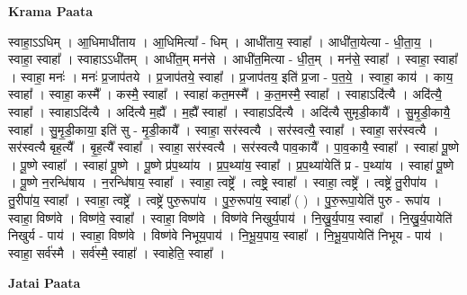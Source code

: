 \documentclass[17pt]{extarticle}
\begin{document}
\textbf{Krama Paata} \newline

स्वाहा॒ऽऽधिम् । आ॒धिमाधी॑ताय । आ॒धिमित्या᳚ - धिम् । आधी॑ताय॒ स्वाहा᳚ । आधी॑ता॒येत्या - धी॒ता॒य॒ । स्वाहा॒ स्वाहा᳚ । स्वाहाऽऽधी॑तम् । आधी॑त॒म् मन॑से । आधी॑त॒मित्या - धी॒त॒म् । मन॑से॒ स्वाहा᳚ । स्वाहा॒ स्वाहा᳚ । स्वाहा॒ मनः॑ । मनः॑ प्र॒जाप॑तये । प्र॒जाप॑तये॒ स्वाहा᳚ । प्र॒जाप॑तय॒ इति॑ प्र॒जा - प॒त॒ये॒ । स्वाहा॒ काय॑ । काय॒ स्वाहा᳚ । स्वाहा॒ कस्मै᳚ । कस्मै॒ स्वाहा᳚ । स्वाहा॑ कत॒मस्मै᳚ । क॒त॒मस्मै॒ स्वाहा᳚ । स्वाहाऽदि॑त्यै । अदि॑त्यै॒ स्वाहा᳚ । स्वाहाऽदि॑त्यै । अदि॑त्यै म॒ह्यै᳚ । म॒ह्यै᳚ स्वाहा᳚ । स्वाहाऽदि॑त्यै । अदि॑त्यै सुमृडी॒कायै᳚ । सु॒मृ॒डी॒कायै॒ स्वाहा᳚ । सु॒मृ॒डी॒काया॒ इति॑ सु - मृ॒डी॒कायै᳚ । स्वाहा॒ सर॑स्वत्यै । सर॑स्वत्यै॒ स्वाहा᳚ । स्वाहा॒ सर॑स्वत्यै । सर॑स्वत्यै बृह॒त्यै᳚ । बृ॒ह॒त्यै᳚ स्वाहा᳚ । स्वाहा॒ सर॑स्वत्यै । सर॑स्वत्यै पाव॒कायै᳚ । पा॒व॒कायै॒ स्वाहा᳚ । स्वाहा॑ पू॒ष्णे । पू॒ष्णे स्वाहा᳚ । स्वाहा॑ पू॒ष्णे । पू॒ष्णे प्र॑प॒थ्या॑य । प्र॒प॒थ्या॑य॒ स्वाहा᳚ । प्र॒प॒थ्या॑येति॑ प्र - प॒थ्या॑य । स्वाहा॑ पू॒ष्णे । पू॒ष्णे न॒रन्धि॑षाय । न॒रन्धि॑षाय॒ स्वाहा᳚ । स्वाहा॒ त्वष्ट्रे᳚ । त्वष्ट्रे॒ स्वाहा᳚ । स्वाहा॒ त्वष्ट्रे᳚ । त्वष्ट्रे॑ तु॒रीपा॑य । तु॒रीपा॑य॒ स्वाहा᳚ । स्वाहा॒ त्वष्ट्रे᳚ । त्वष्ट्रे॑ पुरु॒रूपा॑य । पु॒रु॒रूपा॑य॒ स्वाहा᳚ ( ) । पु॒रु॒रूपा॒येति॑ पुरु - रूपा॑य । स्वाहा॒ विष्ण॑वे । विष्ण॑वे॒ स्वाहा᳚ । स्वाहा॒ विष्ण॑वे । विष्ण॑वे निखुर्य॒पाय॑ । नि॒खु॒र्य॒पाय॒ स्वाहा᳚ । नि॒खु॒र्य॒पायेति॑ निखुर्य - पाय॑ । स्वाहा॒ विष्ण॑वे । विष्ण॑वे निभूय॒पाय॑ । नि॒भू॒य॒पाय॒ स्वाहा᳚ । नि॒भू॒य॒पायेति॑ निभूय - पाय॑ । स्वाहा॒ सर्व॑स्मै । सर्व॑स्मै॒ स्वाहा᳚ । स्वाहेति॒ स्वाहा᳚ । \newline

\textbf{Jatai Paata} \newline
\end{document}

